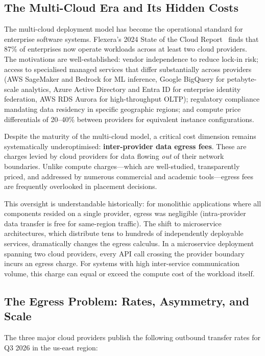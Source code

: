 \documentclass[10pt,journal]{IEEEtran}
\begin{document}
\subsection{The Multi-Cloud Era and Its Hidden Costs}

The multi-cloud deployment model has become the operational standard for
enterprise software systems.
Flexera's 2024 State of the Cloud Report~\cite{flexera2024} finds that
87\% of enterprises now operate workloads across at least two cloud providers.
The motivations are well-established: vendor independence to reduce lock-in risk;
access to specialised managed services that differ substantially across providers
(AWS SageMaker and Bedrock for ML inference, Google BigQuery for petabyte-scale
analytics, Azure Active Directory and Entra ID for enterprise identity federation,
AWS RDS Aurora for high-throughput OLTP); regulatory compliance mandating data
residency in specific geographic regions; and compute price differentials of
20--40\% between providers for equivalent instance configurations.

Despite the maturity of the multi-cloud model, a critical cost dimension remains
systematically underoptimised: \textbf{inter-provider data egress fees}.
These are charges levied by cloud providers for data flowing \emph{out} of their
network boundaries.
Unlike compute charges---which are well-studied, transparently priced, and
addressed by numerous commercial and academic tools---egress fees are
frequently overlooked in placement decisions.

This oversight is understandable historically: for monolithic applications where all
components resided on a single provider, egress was negligible (intra-provider
data transfer is free for same-region traffic).
The shift to microservice architectures, which distribute tens to hundreds of
independently deployable services, dramatically changes the egress calculus.
In a microservice deployment spanning two cloud providers, every API call crossing
the provider boundary incurs an egress charge.
For systems with high inter-service communication volume, this charge can equal or
exceed the compute cost of the workload itself.

\subsection{The Egress Problem: Rates, Asymmetry, and Scale}

The three major cloud providers publish the following outbound transfer rates
for Q3 2026 in the us-east region:
\end{document}
